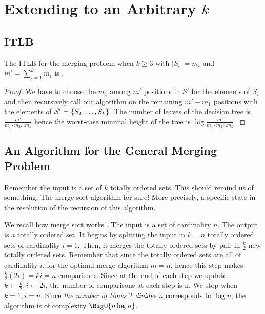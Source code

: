 \section{Extending to an Arbitrary $k$}
\label{tree:merging:kgeq3}


\subsection{ITLB}
\label{tree:merging:kgeq3:ITLB}


\begin{theorem}
The ITLB for the merging problem when $k \geq 3$ with $|S_i| = m_i$ and $m' = \sum_{i=1}^{k} m_i$ is .
\end{theorem}

\begin{proof}
We have to choose the $m_1$ among $m'$ positions in $S'$ for the elements of $S_1$ and then recursively call our algorithm on the remaining $m' - m_1$ positions with the elements of ${\cal S}' = \{S_2, \dots, S_k\}$. The number of leaves of the decision tree is $\frac{m'}{m_1 \cdot m_2 \dots m_k}$ hence the worst-case minimal height of the tree is $\log \frac{m'}{m_1 \cdot m_2 \dots m_k}$.
\end{proof}


\subsection{An Algorithm for the General Merging Problem}
\label{tree:merging:kgeq3:alg}

Remember the input is a set of $k$ totally ordered sets. This should remind us of something. The merge sort algorithm for sure! More precisely, a specific state in the resolution of the recursion of this algorithm.

We recall how merge sort works \cite{leiserson2001introduction}. The input is a set of cardinality $n$. The output is a totally ordered set. It begins by splitting the input in $k = n$ totally ordered sets of cardinality $i = 1$. Then, it merges the totally ordered sets by pair in $\frac{k}{2}$ new totally ordered sets. Remember that since the totally ordered sets are all of cardinality $i$, for the optimal merge algorithm $m=n$, hence this step makes $\frac{k}{2} (2 i) = k i = n$ comparisons. Since at the end of each step we update $k \gets \frac{k}{2}, i \gets 2i$, the number of comparisons at each step is n. We stop when $k = 1, i = n$.
Since \emph{the number of times $2$ divides $n$} corresponds to $\log n$, the algorithm is of complexity $\BigO{n \log n}$.

